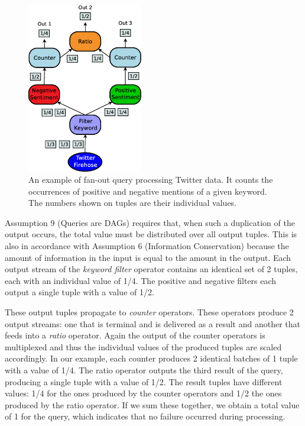 \DIFdelendFL \DIFaddbeginFL \begin{figure}[t]
	\DIFaddendFL \centering
	\includegraphics[width=0.45\textwidth]{img/tesi/fan-out_2} 
	\caption{An example of fan-out query processing Twitter data. It counts the occurrences of positive and
	negative mentions of a given keyword. The numbers shown on tuples are their individual \sic values.}
	\label{fig:query_fanout}
\end{figure}

Assumption 9 (Queries are DAGs) requires that, when such a duplication of the
output occurs, the total \sic value must be distributed over all output tuples. This is also in
accordance with Assumption 6 (Information Conservation) because the amount of information in the input is
equal to the amount in the output.
Each output stream of the \emph{keyword filter} operator contains an identical set of 2
tuples, each with an individual \sic value of 1/4.
The positive and negative filters each output a single tuple with a \sic value of 1/2. 

These output tuples propagate to \emph{counter} operators. These operators produce 2 output
streams: one that is terminal and is delivered as a result and another that feeds into a \emph{ratio}
operator.
Again the output of the counter operators is multiplexed and thus the individual \sic values of
the produced tuples are scaled accordingly. In our example, each counter produces 2 identical batches of
1 tuple with a \sic value of 1/4. The ratio operator outputs the third result of the query, producing a
single tuple with a \sic value of 1/2.
The result tuples have different \sic values: 1/4 for the
ones produced by the counter operators and 1/2 the ones produced by the ratio operator. If we sum
these together, we obtain a total \sic value of 1 for the query, which indicates that
no failure occurred during processing. 


